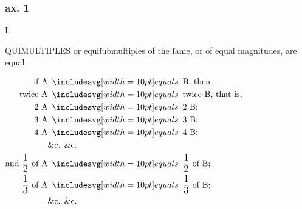 \begin{center}
    \begin{minipage}{0.80\textwidth}
        \subsubsection{ax. 1}
        \begin{center}
            I.\label{book5ax1}\\
            \raggedright \lettrine[lines=3, loversize=1, nindent=0pt]{}{}QUIMULTIPLES or equiſubmultiples of the ſame, or of equal magnitudes, are equal.
        \end{center}

        \hfill

        \centering

        $\begin{aligned}
                \text{if A}                                                       & \bequals \text{B, then}                                         \\
                \text{twice A}                                                    & \bequals \text{twice B, that is,}                               \\
                \text{2 A}                                                        & \bequals \text{2 B;}                                            \\
                \text{3 A}                                                        & \bequals \text{3 B;}                                            \\
                \text{4 A}                                                        & \bequals \text{4 B;}                                            \\
                                                                                  & \text{\&c. \&c.}                                                \\
                \text{and } \dfrac{\text{\large 1}}{\text{\large 2}} \text{ of A} & \bequals \dfrac{\text{\large 1}}{\text{\large 2}} \text{ of B;} \\
                \dfrac{\text{\large 1}}{\text{\large 3}} \text{ of A}             & \bequals \dfrac{\text{\large 1}}{\text{\large 3}} \text{ of B;} \\
                                                                                  & \text{\&c. \&c.}
            \end{aligned}$\\


\end{minipage}
\end{center}
